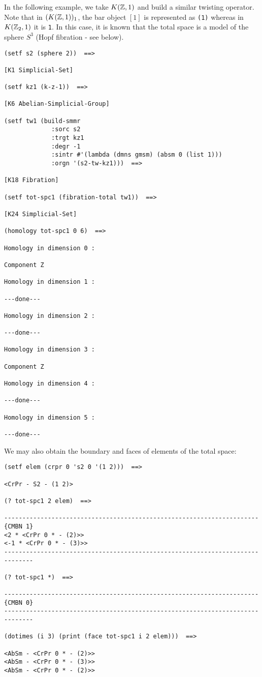 In the following example, we take $K({{\Bbb Z}},1)$ and build a similar twisting o\-pe\-ra\-tor. Note
that in $(K({{\Bbb Z}},1))_1$, the bar object $[1]$ is represented as {\tt (1)} whereas in $K({{\Bbb Z}}_2,1)$ it
is {\tt 1}. In this case, it is known that the total space is a model of the sphere $S^3$ 
(Hopf fibration - see below). 
{\footnotesize\begin{verbatim}
(setf s2 (sphere 2))  ==>

[K1 Simplicial-Set]

(setf kz1 (k-z-1))  ==>

[K6 Abelian-Simplicial-Group]

(setf tw1 (build-smmr
             :sorc s2
             :trgt kz1
             :degr -1
             :sintr #'(lambda (dmns gmsm) (absm 0 (list 1)))
             :orgn '(s2-tw-kz1)))  ==>

[K18 Fibration]

(setf tot-spc1 (fibration-total tw1))  ==>

[K24 Simplicial-Set]

(homology tot-spc1 0 6)  ==>

Homology in dimension 0 :

Component Z

Homology in dimension 1 :

---done---

Homology in dimension 2 :

---done---

Homology in dimension 3 :

Component Z

Homology in dimension 4 :

---done---

Homology in dimension 5 :

---done---
\end{verbatim}}
We may also obtain the boundary and faces of elements of the total space:
{\footnotesize\begin{verbatim}
(setf elem (crpr 0 's2 0 '(1 2)))  ==>

<CrPr - S2 - (1 2)>

(? tot-spc1 2 elem)  ==>

----------------------------------------------------------------------{CMBN 1}
<2 * <CrPr 0 * - (2)>>
<-1 * <CrPr 0 * - (3)>>
------------------------------------------------------------------------------

(? tot-spc1 *)  ==>

----------------------------------------------------------------------{CMBN 0}
------------------------------------------------------------------------------

(dotimes (i 3) (print (face tot-spc1 i 2 elem)))  ==>

<AbSm - <CrPr 0 * - (2)>> 
<AbSm - <CrPr 0 * - (3)>> 
<AbSm - <CrPr 0 * - (2)>> 
\end{verbatim}}
